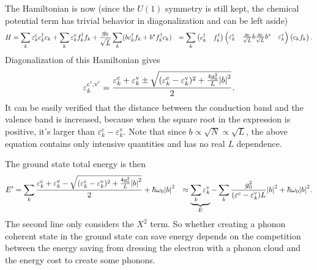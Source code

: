 \documentclass[hyperref, a4paper]{article}
\def\\{}%
\begin{document}
The Hamiltonian is now 
(since the $U(1)$ symmetry is still kept, 
the chemical potential term has trivial behavior in diagonalization 
and can be left aside)
\begin{equation}
    \begin{aligned}
        H &= \sum_k \varepsilon^{\text{c}}_k c^\dagger_k c_k
        + \sum_k \varepsilon^{\text{v}}_k f^\dagger_k f_k 
        + \frac{g_0}{\sqrt{L}} \sum_k (b c^\dagger_k f_k + b^* f^\dagger_k c_k) \\
        &= \sum_k \pmqty{
            c^\dagger_k & f_k^\dagger
        } \pmqty{
            \varepsilon^{\text{c}}_k & \frac{g_0}{\sqrt{L}} b \\
            \frac{g_0}{\sqrt{L}} b^* & \varepsilon^{\text{v}}_k
        } \pmqty{
            c_k \\ f_k
        } .
    \end{aligned}
\end{equation}
Diagonalization of this Hamiltonian gives
\begin{equation}
    \varepsilon_k^{\text{c}', \text{v}'} = \frac{
        \varepsilon^{\text{c}}_k + \varepsilon^{\text{v}}_k 
        \pm \sqrt{
            (\varepsilon^{\text{c}}_k - \varepsilon^{\text{v}}_k)^2 
            + \frac{4 g_0^2}{L} \abs{b}^2
        }
    }{2}.
    \label{eq:diag-energy}
\end{equation}
It can be easily verified that 
the distance between the conduction band and the valence band is increased,
because when the square root in the expression is positive, 
it's larger than $\varepsilon^{\text{c}}_k - \varepsilon^{\text{v}}_k$.
Note that since $b \propto \sqrt{N} \propto \sqrt{L}$,
the above equation contains only intensive quantities 
and has no real $L$ dependence.

The ground state total energy is then 
\begin{equation}
    \begin{aligned}
        E' &= \sum_k \frac{
            \varepsilon^{\text{c}}_k + \varepsilon^{\text{v}}_k 
            - \sqrt{
                (\varepsilon^{\text{c}}_k - \varepsilon^{\text{v}}_k)^2 
                + \frac{4 g_0^2}{L} \abs{b}^2
            }
        }{2} + \hbar \omega_0 \abs{b}^2 \\
        &\approx \underbrace{\sum_k \varepsilon^{\text{v}}_k}_{E} 
        - \sum_k \frac{g_0^2}{(\varepsilon^{\text{c}} - \varepsilon^{\text{v}}_k) L} \abs{b}^2
        + \hbar \omega_0 \abs{b}^2.
    \end{aligned}
    \label{eq:ground-state-phonon}
\end{equation}
The second line only considers the $X^2$ term.
So whether creating a phonon coherent state in the ground state can save energy 
depends on the competition between 
the energy saving from dressing the electron 
with a phonon cloud 
and the energy cost to create some phonons.
\end{document}
